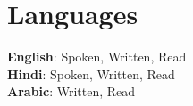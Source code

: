 \documentclass[letterpaper,11pt]{article}
\begin{document}
    \section{Languages}
        \begin{itemize}[leftmargin=0.15in, label={}]
            \small{\item{
                    \textbf{English}{: Spoken, Written, Read} \\
                    \textbf{Hindi}{: Spoken, Written, Read} \\
                    \textbf{Arabic}{: Written, Read} 
            }}
        \end{itemize}

\end{document}
